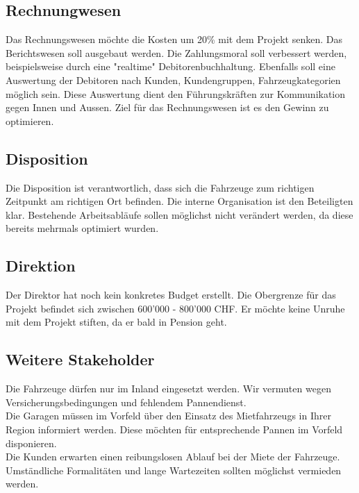 \subsection{Rechnungwesen}
Das Rechnungswesen möchte die Kosten um 20\% mit dem Projekt senken. Das Berichtswesen soll ausgebaut werden. Die Zahlungsmoral soll verbessert werden, beispielsweise durch eine "realtime" Debitorenbuchhaltung. Ebenfalls soll eine Auswertung der Debitoren nach Kunden, Kundengruppen, Fahrzeugkategorien möglich sein. Diese Auswertung dient den Führungskräften zur Kommunikation gegen Innen und Aussen. Ziel für das Rechnungswesen ist es den Gewinn zu optimieren.

\subsection{Disposition}
Die Disposition ist verantwortlich, dass sich die Fahrzeuge zum richtigen Zeitpunkt am richtigen Ort befinden. Die interne Organisation ist den Beteiligten klar. Bestehende Arbeitsabläufe sollen möglichst nicht verändert werden, da diese bereits mehrmals optimiert wurden.

\subsection{Direktion}
Der Direktor hat noch kein konkretes Budget erstellt. Die Obergrenze für das Projekt befindet sich zwischen 600'000 - 800'000 CHF. Er möchte keine Unruhe mit dem Projekt stiften, da er bald in Pension geht.

\subsection{Weitere Stakeholder}
Die Fahrzeuge dürfen nur im Inland eingesetzt werden. Wir vermuten wegen Versicherungsbedingungen und fehlendem Pannendienst. \\
Die Garagen müssen im Vorfeld über den Einsatz des Mietfahrzeugs in Ihrer Region informiert werden. Diese möchten für entsprechende Pannen im Vorfeld disponieren. \\
Die Kunden erwarten einen reibungslosen Ablauf bei der Miete der Fahrzeuge. Umständliche Formalitäten und lange Wartezeiten sollten möglichst vermieden werden.